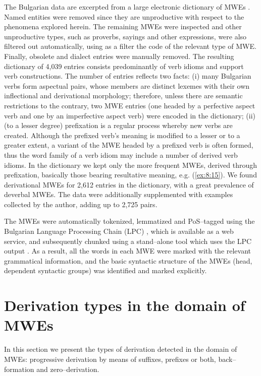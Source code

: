\documentclass[output=paper]{langsci/langscibook}
\begin{document}
The Bulgarian data are excerpted from a large electronic dictionary of
MWEs \citep{Stoyanova2014}. Named entities were removed since
they are unproductive with respect to the phenomena explored herein.
The remaining MWEs were inspected and other unproductive types, such as
proverbs, sayings and other expressions, were also filtered out
automatically, using as a filter the code of the relevant type of MWE.
Finally, obsolete and dialect entries were manually removed. The
resulting dictionary of 4,039 entries consists predominantly of verb
idioms and support verb constructions. The number of entries reflects
two facts: (i) many Bulgarian verbs form aspectual pairs, whose members
are distinct lexemes with their own inflectional and derivational
morphology; therefore, unless there are semantic restrictions to the
contrary, two MWE entries (one headed by a perfective aspect verb and
one by an imperfective aspect verb) were encoded in the dictionary;
(ii) (to a lesser degree) prefixation is a regular process whereby new
verbs are created. Although the prefixed verb’s meaning is modified to
a lesser or to a greater extent, a variant of the MWE headed by a
prefixed verb is often formed, thus the word family of a verb idiom may
include a number of derived verb idioms. In the dictionary we kept only
the more frequent MWEs, derived through prefixation, basically those
bearing resultative meaning, e.g. (\ref{ex:8:15}). We found derivational MWEs for
2,612 entries in the dictionary, with a great prevalence of deverbal
MWEs. The data were additionally supplemented with examples collected
by the author, adding up to 2,725 pairs.



The MWEs were automatically tokenized, lemmatized and PoS–tagged using
the Bulgarian Language Processing Chain (LPC) \citep{koeva2011},
which is available as a web service, and subsequently chunked using a
stand–alone tool which uses the LPC output \citep{Stoyanova2015}. As a result, all the words in each MWE were marked with
the relevant grammatical information, and the basic syntactic structure
of the MWEs (head, dependent syntactic groups) was identified and
marked explicitly.




\section{Derivation types in the domain of MWEs }

In this section we present the types of derivation detected in the
domain of MWEs: progressive derivation by means of suffixes, prefixes
or both, back–\linebreak formation and zero–derivation.
\end{document}
